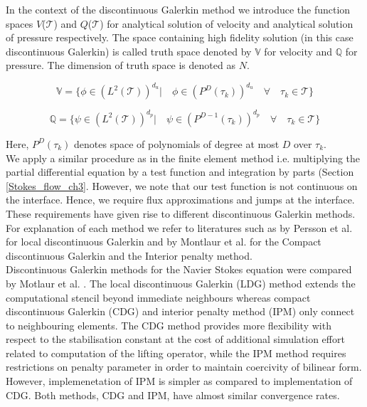 \documentclass[a4paper]{book}
\begin{document}
In the context of the discontinuous Galerkin method we introduce the function spaces $V$($\mathcal{T}$) and $Q$($\mathcal{T}$) for analytical solution of velocity and analytical solution of pressure respectively. The space containing high fidelity solution (in this case discontinuous Galerkin) is called truth space denoted by $\mathbb{V}$ for velocity and $\mathbb{Q}$ for pressure. The dimension of truth space is denoted as $N$. 

\begin{equation} \label{velocity_test}
\mathbb{V} = \lbrace \phi \in (L^2(\mathcal{T}))^{d_u}| \quad \phi \in (P^D(\tau_k))^{d_u} \quad \forall \quad {\tau_k} \in \mathcal{T} \rbrace
\end{equation}

\begin{equation} \label{pressure_test}
\mathbb{Q} = \lbrace \psi \in (L^2(\mathcal{T}))^{d_p}| \quad \psi \in (P^{D-1}(\tau_k))^{d_p} \quad \forall \quad {\tau_k} \in \mathcal{T} \rbrace
\end{equation}

Here, $P^D(\tau_k)$ denotes space of polynomials of degree at most $D$ over $\tau_k$.\\

We apply a similar procedure as in the finite element method i.e. multiplying the partial differential equation by a test function and integration by parts (Section \ref{Stokes_flow_ch3}. However, we note that our test function is not continuous on the interface. Hence, we require flux approximations and jumps at the interface. These requirements have given rise to different discontinuous Galerkin methods. For explanation of each method we refer to literatures such as by Persson et al. \cite{persson} for local discontinuous Galerkin and by Montlaur et al. \cite{Montlaur} for the Compact discontinuous Galerkin and the Interior penalty method. \\

Discontinuous Galerkin methods for the Navier Stokes equation were compared by Motlaur et al. \cite{Montlaur}. The local discontinuous Galerkin (LDG) method extends the computational stencil beyond immediate neighbours whereas compact discontinuous Galerkin (CDG) and interior penalty method (IPM) only connect to neighbouring elements. The CDG method provides more flexibility with respect to the stabilisation constant at the cost of additional simulation effort related to computation of the lifting operator, while the IPM method requires restrictions on penalty parameter in order to maintain coercivity of bilinear form. However, implemenetation of IPM is simpler as compared to implementation of CDG. Both methods, CDG and IPM, have almost similar convergence rates. 
\end{document}
